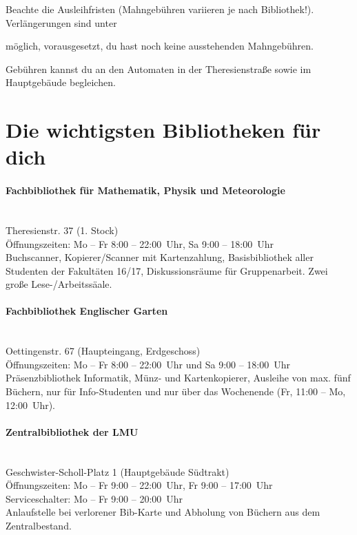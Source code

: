 Beachte die Ausleihfristen (Mahngebühren variieren je nach Bibliothek!). 
Verlängerungen sind unter 
\begin{urlList}
\end{urlList}
möglich, vorausgesetzt, du hast noch keine ausstehenden Mahngebühren.

Gebühren kannst du an den Automaten in der Theresienstraße sowie
im Hauptgebäude begleichen.


\section{Die wichtigsten Bibliotheken für dich}

\paragraph{Fachbibliothek für Mathematik, Physik und Meteorologie}\hfill\\
Theresienstr. 37 (1. Stock)\\
Öffnungszeiten: Mo -- Fr 8:00 -- 22:00~Uhr, Sa 9:00 -- 18:00~Uhr\\
Buchscanner, Kopierer/Scanner mit Kartenzahlung, Basisbibliothek aller
Studenten der Fakultäten 16/17, Diskussionsräume für Gruppenarbeit.
Zwei große Lese-/Arbeitssäale.

\paragraph{Fachbibliothek Englischer Garten}\hfill\\
Oettingenstr. 67 (Haupteingang, Erdgeschoss)\\
Öffnungszeiten: Mo -- Fr 8:00 -- 22:00~Uhr und Sa 9:00 -- 18:00~Uhr\\
Präsenzbibliothek Informatik, Münz- und Kartenkopierer, Ausleihe von max. fünf Büchern, nur für Info-Studenten und nur über das Wochenende (Fr, 11:00 -- Mo, 12:00~Uhr).

\paragraph{Zentralbibliothek der LMU}\hfill\\
Geschwister-Scholl-Platz 1 (Hauptgebäude Südtrakt)\\
Öffnungszeiten: Mo -- Fr 9:00 -- 22:00~Uhr, Fr 9:00 -- 17:00~Uhr\\
Serviceschalter: Mo -- Fr 9:00 -- 20:00~Uhr\\
Anlaufstelle bei verlorener Bib-Karte und Abholung von Büchern aus dem Zentralbestand.

